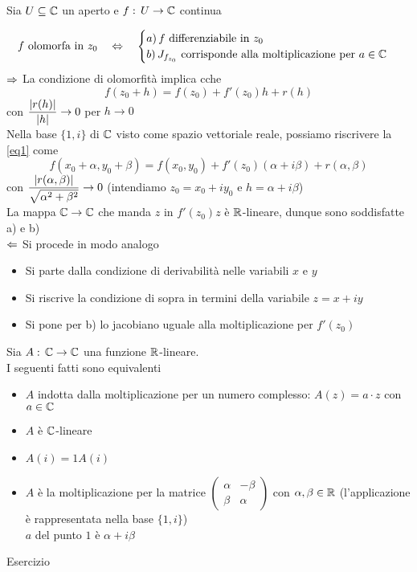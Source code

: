 \begin{thm}
Sia $U \subseteq \mathbb{C}$ un aperto e $f:\, U \to \mathbb{C}$ continua

$$ f\text{ olomorfa in } z_0 \quad \Leftrightarrow \quad \begin{cases} a)\, f \text{ differenziabile in } z_0 \\
																								  b)\, J_{f_{z_0}} \text{ corrisponde alla moltiplicazione per } a \in \mathbb{C}
\end{cases}$$
\proof $\Rightarrow$ La condizione di olomorfit\`a implica cche 
\begin{equation}
\label{eq1}
f(z_0+h)=f(z_0)+f'(z_0)h + r(h)
\end{equation}
con $\displaystyle \frac{\left\vert r(h) \right\vert}{\left\vert h \right\vert} \to 0 $ per $h \to 0 $\\
Nella base $\{1 , i\}$ di $\mathbb{C}$ visto come spazio vettoriale reale, possiamo riscrivere la \ref{eq1} come 
$$ f(x_0+\alpha, y_0+\beta)=f(x_0,y_0) + f'(z_0)(\alpha+i\beta) + r(\alpha,\beta)$$ 
con $\displaystyle \frac{\left\vert r(\alpha,\beta) \right\vert}{\sqrt{\alpha^2 + \beta^2 }}\to 0 $ (intendiamo $z_0=x_0+iy_0$ e $h =\alpha+i\beta$)\\
La mappa $\mathbb{C} \to \mathbb{C}$ che manda $z$ in $f'(z_0)z$ \`e $\mathbb{R}$-lineare, dunque sono soddisfatte a) e b)\\
$\Leftarrow$ Si procede in modo analogo
\begin{itemize}
\item Si parte dalla condizione di derivabilit\`a nelle variabili $x$ e $y$
\item Si riscrive la condizione di sopra in termini della variabile $z=x+iy$
\item Si pone per b) lo jacobiano uguale alla moltiplicazione per $f'(z_0)$
\end{itemize}
\endproof
\end{thm}
\begin{lem}Sia $A:\, \mathbb{C}\to \mathbb{C}$ una funzione $\mathbb{R}$-lineare.\\
I seguenti fatti sono equivalenti
\begin{itemize}
\item $A$ indotta dalla moltiplicazione per un numero complesso: $A(z) = a\cdot z $ con $a\in \mathbb{C}$
\item $A$ \`e $\mathbb{C}$-lineare
\item $A(i)=1A(i)$
\item $A$ \`e la moltiplicazione per la matrice $\begin{pmatrix}
 \alpha & - \beta \\ \beta & \alpha
\end{pmatrix}$ con $\alpha, \beta \in \mathbb{R}$ (l'applicazione \`e rappresentata nella base $\{1 , i\}$)\\
$a$ del punto $1$ \`e $\alpha+i\beta$
\end{itemize}
\proof Esercizio
\end{lem}
